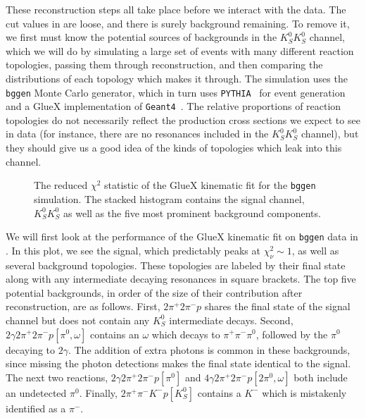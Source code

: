 These reconstruction steps all take place before we interact with the data. The cut values in  are loose, and there is surely background remaining. To remove it, we first must know the potential sources of backgrounds in the $K_S^0K_S^0$ channel, which we will do by simulating a large set of events with many different reaction topologies, passing them through reconstruction, and then comparing the distributions of each topology which makes it through. The simulation uses the \texttt{bggen} Monte Carlo generator, which in turn uses \texttt{PYTHIA}~\cite{Bierlich2022} for event generation and a GlueX implementation of \texttt{Geant4}~\cite{Allison2006,Allison2016,Agostinelli2003}. The relative proportions of reaction topologies do not necessarily reflect the production cross sections we expect to see in data (for instance, there are no resonances included in the $K_S^0K_S^0$ channel), but they should give us a good idea of the kinds of topologies which leak into this channel.

\begin{figure}
  \begin{center}
    
  \end{center}
  \caption{The reduced $\chi^2$ statistic of the GlueX kinematic fit for the \texttt{bggen} simulation. The stacked histogram contains the signal channel, $K_S^0K_S^0$ as well as the five most prominent background components.}\label{fig:bggen-chisqdof}
\end{figure}

We will first look at the performance of the GlueX kinematic fit on \texttt{bggen} data in . In this plot, we see the signal, which predictably peaks at $\chi^2_\nu \sim 1$, as well as several background topologies. These topologies are labeled by their final state along with any intermediate decaying resonances in square brackets. The top five potential backgrounds, in order of the size of their contribution after reconstruction, are as follows. First, $2\pi^+2\pi^- p$ shares the final state of the signal channel but does not contain any $K_S^0$ intermediate decays. Second, $2\gamma 2\pi^+ 2\pi^- p [\pi^0, \omega]$ contains an $\omega$ which decays to $\pi^+\pi^-\pi^0$, followed by the $\pi^0$ decaying to $2\gamma$. The addition of extra photons is common in these backgrounds, since missing the photon detections makes the final state identical to the signal. The next two reactions, $2\gamma 2\pi^+ 2\pi^- p [\pi^0]$ and $4\gamma 2\pi^+ 2\pi^- p [2\pi^0, \omega]$ both include an undetected $\pi^0$. Finally, $2\pi^+\pi^- K^- p[K_S^0]$ contains a $K^-$ which is mistakenly identified as a $\pi^-$.

